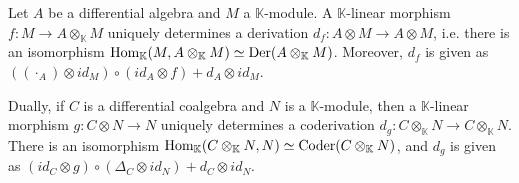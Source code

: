 \documentclass[../thesis.tex]{subfiles}
\begin{document}
            \begin{proposition}\label{prop: free-derivation}
                Let $A$ be a differential algebra and $M$ a $\mathbb{K}$-module. A $\mathbb{K}$-linear morphism $f:M\rightarrow A\otimes_{\mathbb{K}} M$ uniquely determines a derivation $d_f:A\otimes M\rightarrow A\otimes M$, i.e. there is an isomorphism $\tt{Hom}_{\mathbb{K}}(M,A\otimes_{\mathbb{K}}M)\simeq \tt{Der}(A\otimes_{\mathbb{K}}M)$. Moreover, $d_f$ is given as $((\cdot_A)\otimes id_M)\circ (id_A\otimes f) + d_A\otimes id_M$.

                Dually, if $C$ is a differential coalgebra and $N$ is a $\mathbb{K}$-module, then a $\mathbb{K}$-linear morphism $g:C\otimes N\rightarrow N$ uniquely determines a coderivation $d_g:C\otimes_{\mathbb{K}}N\rightarrow C\otimes_{\mathbb{K}}N$. There is an isomorphism $\tt{Hom}_{\mathbb{K}}(C\otimes_{\mathbb{K}}N,N)\simeq \tt{Coder}(C\otimes_{\mathbb{K}}N)$, and $d_g$ is given as $(id_C\otimes g)\circ (\Delta_C\otimes id_N) + d_C\otimes id_N$.
            \end{proposition}
\end{document}
